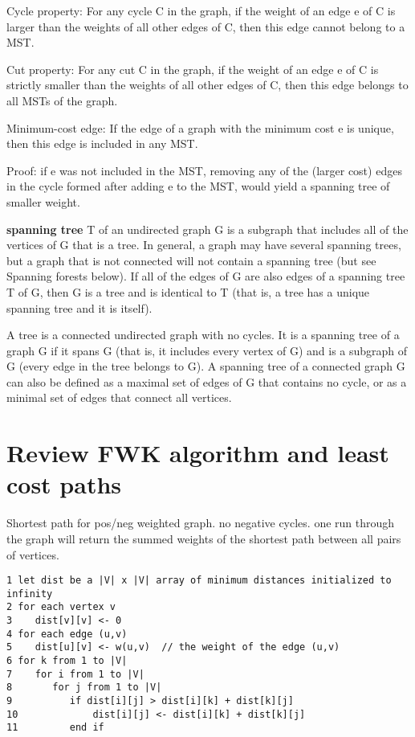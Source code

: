 \documentclass[10 pt]{article}
\begin{document}
Cycle property: For any cycle C in the graph, if the weight of an edge e of C is larger than the weights of all other edges of C, then this edge cannot belong to a MST.

Cut property: For any cut C in the graph, if the weight of an edge e of C is strictly smaller than the weights of all other edges of C, then this edge belongs to all MSTs of the graph.

Minimum-cost edge: If the edge of a graph with the minimum cost e is unique, then this edge is included in any MST.

Proof: if e was not included in the MST, removing any of the (larger cost) edges in the cycle formed after adding e to the MST, would yield a spanning tree of smaller weight.

\textbf{spanning tree} T of an undirected graph G is a subgraph that includes all of the vertices of G that is a tree. In general, a graph may have several spanning trees, but a graph that is not connected will not contain a spanning tree (but see Spanning forests below). If all of the edges of G are also edges of a spanning tree T of G, then G is a tree and is identical to T (that is, a tree has a unique spanning tree and it is itself).

A tree is a connected undirected graph with no cycles. It is a spanning tree of a graph G if it spans G (that is, it includes every vertex of G) and is a subgraph of G (every edge in the tree belongs to G). A spanning tree of a connected graph G can also be defined as a maximal set of edges of G that contains no cycle, or as a minimal set of edges that connect all vertices.

\section{Review FWK algorithm and least cost paths}
Shortest path for pos/neg weighted graph. no negative cycles. 
one run through the graph will return the summed weights of the shortest path between all pairs of vertices. 

\begin{verbatim}
1 let dist be a |V| x |V| array of minimum distances initialized to infinity
2 for each vertex v
3    dist[v][v] <- 0
4 for each edge (u,v)
5    dist[u][v] <- w(u,v)  // the weight of the edge (u,v)
6 for k from 1 to |V|
7    for i from 1 to |V|
8       for j from 1 to |V|
9          if dist[i][j] > dist[i][k] + dist[k][j] 
10             dist[i][j] <- dist[i][k] + dist[k][j]
11         end if
\end{verbatim}
\end{document}
